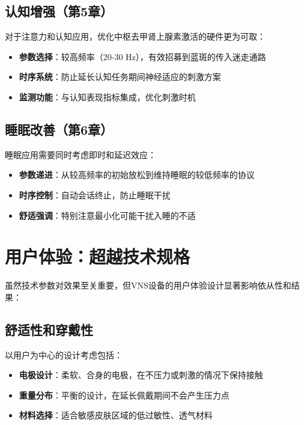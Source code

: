 \documentclass[
  Letterpaper,
]{scrbook}
\providecommand{\tightlist}{%
  \setlength{\itemsep}{0pt}\setlength{\parskip}{0pt}}\usepackage{longtable,booktabs,array}
\begin{document}
\subsection{认知增强（第5章）}\label{ux8ba4ux77e5ux589eux5f3aux7b2c5ux7ae0}

对于注意力和认知应用，优化中枢去甲肾上腺素激活的硬件更为可取：

\begin{itemize}
\tightlist
\item
  \textbf{参数选择}：较高频率（20-30 Hz），有效招募到蓝斑的传入迷走通路
\item
  \textbf{时序系统}：防止延长认知任务期间神经适应的刺激方案
\item
  \textbf{监测功能}：与认知表现指标集成，优化刺激时机
\end{itemize}

\subsection{睡眠改善（第6章）}\label{ux7761ux7720ux6539ux5584ux7b2c6ux7ae0}

睡眠应用需要同时考虑即时和延迟效应：

\begin{itemize}
\tightlist
\item
  \textbf{参数递进}：从较高频率的初始放松到维持睡眠的较低频率的协议
\item
  \textbf{时序控制}：自动会话终止，防止睡眠干扰
\item
  \textbf{舒适强调}：特别注意最小化可能干扰入睡的不适
\end{itemize}

\section{用户体验：超越技术规格}\label{ux7528ux6237ux4f53ux9a8cux8d85ux8d8aux6280ux672fux89c4ux683c}

虽然技术参数对效果至关重要，但VNS设备的用户体验设计显著影响依从性和结果：

\subsection{舒适性和穿戴性}\label{ux8212ux9002ux6027ux548cux7a7fux6234ux6027}

以用户为中心的设计考虑包括：

\begin{itemize}
\tightlist
\item
  \textbf{电极设计}：柔软、合身的电极，在不压力或刺激的情况下保持接触
\item
  \textbf{重量分布}：平衡的设计，在延长佩戴期间不会产生压力点
\item
  \textbf{材料选择}：适合敏感皮肤区域的低过敏性、透气材料
\end{itemize}
\end{document}
